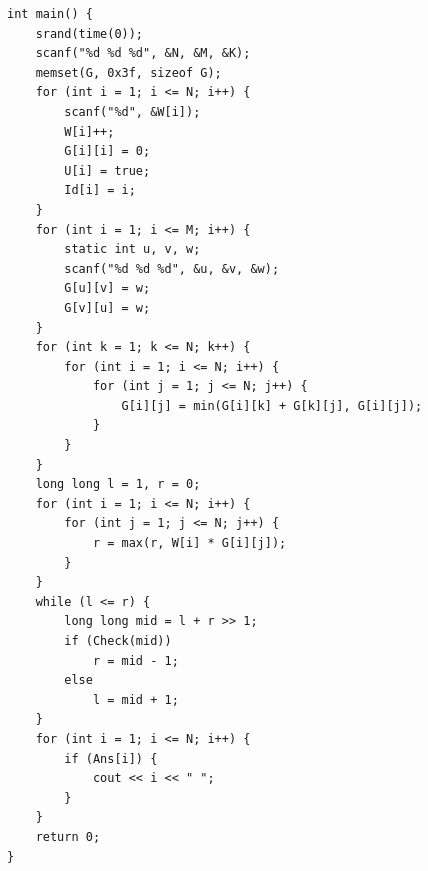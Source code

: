 \documentclass{cumcmthesis}
\begin{document}
\begin{appendices}
\begin{lstlisting}
int main() {
    srand(time(0)); 
    scanf("%d %d %d", &N, &M, &K);
    memset(G, 0x3f, sizeof G);
    for (int i = 1; i <= N; i++) {
        scanf("%d", &W[i]);
        W[i]++;
        G[i][i] = 0;
        U[i] = true;
        Id[i] = i;
    }
    for (int i = 1; i <= M; i++) {
        static int u, v, w;
        scanf("%d %d %d", &u, &v, &w);
        G[u][v] = w;
        G[v][u] = w;
    }
    for (int k = 1; k <= N; k++) {
        for (int i = 1; i <= N; i++) {
            for (int j = 1; j <= N; j++) {
                G[i][j] = min(G[i][k] + G[k][j], G[i][j]);
            }
        }
    }
    long long l = 1, r = 0;
    for (int i = 1; i <= N; i++) {
        for (int j = 1; j <= N; j++) {
            r = max(r, W[i] * G[i][j]);
        }
    }
    while (l <= r) {
        long long mid = l + r >> 1;
        if (Check(mid))
            r = mid - 1;
        else
            l = mid + 1;
    }
    for (int i = 1; i <= N; i++) {
        if (Ans[i]) {
            cout << i << " ";
        }
    }
    return 0;
}
\end{lstlisting}

\end{appendices}
\end{document}
